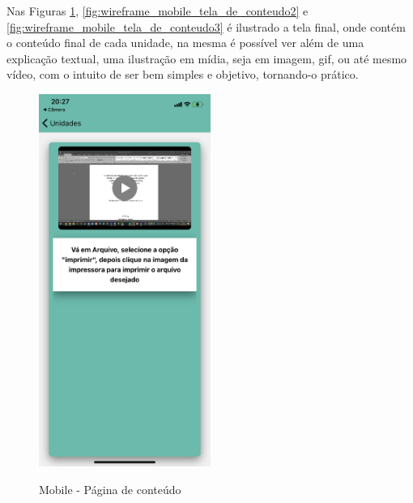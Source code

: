 Nas Figuras \ref{fig:wireframe_mobile_tela_de_conteudo}, \ref{fig:wireframe_mobile_tela_de_conteudo2} e \ref{fig:wireframe_mobile_tela_de_conteudo3} é ilustrado a tela final, onde contém o conteúdo final de cada unidade, na mesma é possível ver além de uma explicação textual, uma ilustração em mídia, seja em imagem, gif, ou até mesmo vídeo, com o intuito de ser bem simples e objetivo, tornando-o prático.

\begin{figure}[H]
    \centering
    \caption{Mobile - Página de conteúdo}
    \includegraphics[width=0.5\textwidth]{figuras/Mobile - pagina de conteudo.png}
    \label{fig:wireframe_mobile_tela_de_conteudo}
    {}
\end{figure}

